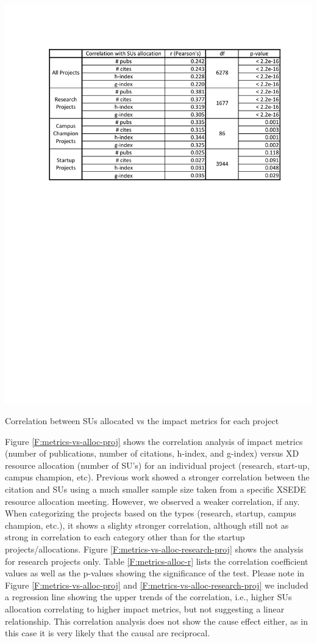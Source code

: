 \documentclass{sig-alternate}
\begin{document}
\begin{table}[!htb] 
  \centering 
    \includegraphics[width=1.0\columnwidth]{images/metrics_alloc_r.pdf} 
  \caption{Correlation between SUs allocated vs the impact metrics for each project}\label{F:metrics-alloc-r} 
\end{table} 
 
Figure \ref{F:metrics-vs-alloc-proj} shows the correlation analysis of impact metrics (number of publications, number of citations, h-index, and g-index) versus XD resource allocation (number of SU's) for an individual project (research, start-up, campus champion, etc).  Previous work showed a stronger correlation between the citation and SUs \cite{bollen2011and} using a much smaller sample size taken from a specific XSEDE resource allocation meeting. However, we observed a weaker correlation, if any. When categorizing the projects based on the types (research, startup, campus champion, etc.), it shows a slighty stronger correlation,  although still not as strong in correlation to each category other than for the startup projects/allocations. Figure \ref{F:metrics-vs-alloc-research-proj} shows the analysis for research projects only. Table \ref{F:metrics-alloc-r} lists the correlation coefficient values as well as the p-values showing the significance of the test. Please note in Figure \ref{F:metrics-vs-alloc-proj} and \ref{F:metrics-vs-alloc-research-proj} we included a regression line showing the upper trends of the correlation, i.e., higher SUs allocation correlating to higher impact metrics, but not suggesting a linear relationship. This correlation analysis does not show the cause effect either, as in this case it is very likely that the causal are reciprocal. 
 
\end{document}
